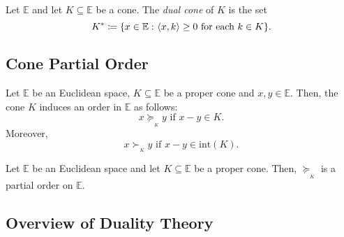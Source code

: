 \documentclass[a4paper]{article}
\begin{document}
\begin{definition}
Let \(\mathbb{E}\) and let \(K\subseteq \mathbb{E}\) be a cone. The \emph{dual cone} of \(K\) is the set \[K^\ast\coloneqq\{x\in\mathbb{E}\,\colon \langle x,k \rangle\geq 0 \text{ for each } k\in K\}.\] 
\end{definition}

\subsection*{Cone Partial Order}

\begin{definition}{}

  Let $\mathbb{E}$ be an Euclidean space, $K\subseteq\mathbb{E}$ 
  be a proper cone and $x,y \in \mathbb{E}$. Then, the 
  cone $K$ induces an order in $\mathbb{E}$ as follows:
  $$ x \succeq_{_K} y \text{ if }  x-y \in K.$$
  Moreover,
  $$ x \succ_{_K} y \text{ if } x-y \in \text{int}(K).$$

\end{definition}

\begin{lemma}\label{conepartialorder}

  Let $\mathbb{E}$ be an Euclidean space and let 
  $K\subseteq\mathbb{E}$ be a proper cone. Then, 
  \mbox{$\succeq_{_K}$} is a partial order on $\mathbb{E}$.
\end{lemma}


\subsection*{Overview of Duality Theory}
\end{document}
